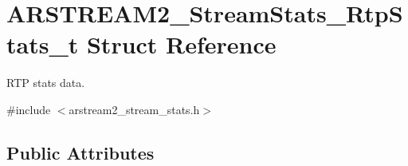 \hypertarget{struct_a_r_s_t_r_e_a_m2___stream_stats___rtp_stats__t}{}\section{A\+R\+S\+T\+R\+E\+A\+M2\+\_\+\+Stream\+Stats\+\_\+\+Rtp\+Stats\+\_\+t Struct Reference}
\label{struct_a_r_s_t_r_e_a_m2___stream_stats___rtp_stats__t}


R\+TP stats data.  




{\ttfamily \#include $<$arstream2\+\_\+stream\+\_\+stats.\+h$>$}

\subsection*{Public Attributes}
